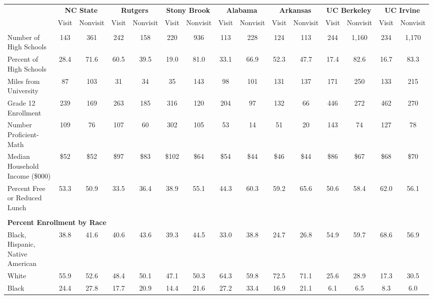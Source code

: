 \begin{tabular*}{\linewidth}{@{\extracolsep{\fill} } lcccccccccccccc}%
&\multicolumn{2}{c}{\bfseries NC State}&\multicolumn{2}{c}{\bfseries Rutgers}&\multicolumn{2}{c}{\bfseries Stony Brook}&\multicolumn{2}{c}{\bfseries Alabama}&\multicolumn{2}{c}{\bfseries Arkansas}&\multicolumn{2}{c}{\bfseries UC Berkeley}&\multicolumn{2}{c}{\bfseries UC Irvine}\\%
&Visit&\multicolumn{1}{l}{Nonvisit}&Visit&\multicolumn{1}{l}{Nonvisit}&Visit&\multicolumn{1}{l}{Nonvisit}&Visit&\multicolumn{1}{l}{Nonvisit}&Visit&\multicolumn{1}{l}{Nonvisit}&Visit&\multicolumn{1}{l}{Nonvisit}&Visit&\multicolumn{1}{l}{Nonvisit}\\%
\hline%
&&&&&&&&&&&&&&\\%
\hspace{0cm}Number of High Schools&143&361&242&158&220&936&113&228&124&113&244&1,160&234&1,170\\%
Percent of High Schools&28.4&71.6&60.5&39.5&19.0&81.0&33.1&66.9&52.3&47.7&17.4&82.6&16.7&83.3\\%
\hspace{0cm}Miles from University&87&103&31&34&35&143&98&101&131&137&171&250&133&215\\%
\hspace{0cm}Grade 12 Enrollment&239&169&263&185&316&120&204&97&132&66&446&272&462&270\\%
\hspace{0cm}Number Proficient{-}Math&109&76&107&60&302&105&53&14&51&20&143&74&127&78\\%
\hspace{0cm}Median Household Income (\$000)&\$52&\$52&\$97&\$83&\$102&\$64&\$54&\$44&\$46&\$44&\$86&\$67&\$68&\$70\\%
\hspace{0cm}Percent Free or Reduced Lunch&53.3&50.9&33.5&36.4&38.9&55.1&44.3&60.3&59.2&65.6&50.6&58.4&62.0&56.1\\%
&&&&&&&&&&&&&&\\%
\multicolumn{15}{l}{\bfseries Percent Enrollment by Race}\\%
\hspace{0.2cm}Black, Hispanic, Native American&38.8&41.6&40.6&43.6&39.3&44.5&33.0&38.8&24.7&26.8&54.9&59.7&68.6&56.9\\%
\hspace{0.2cm}White&55.9&52.6&48.4&50.1&47.1&50.3&64.3&59.8&72.5&71.1&25.6&28.9&17.3&30.5\\%
\hspace{0.2cm}Black&24.4&27.8&17.7&20.9&14.4&21.6&27.2&33.4&16.9&21.1&6.1&6.5&8.3&6.0\\%

\end{tabular*}
